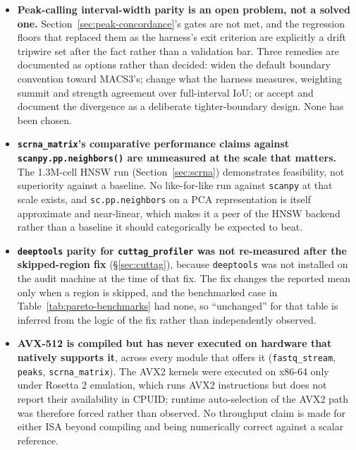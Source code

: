 \documentclass[10pt,twocolumn]{article}
\begin{document}
\begin{itemize}\itemsep3pt

\item \textbf{Peak-calling interval-width parity is an open problem, not a
  solved one.} Section~\ref{sec:peak-concordance}'s \ParityGate{} gates are
  not met, and the regression floors that replaced them as the harness's exit
  criterion are explicitly a drift tripwire set after the fact rather than a
  validation bar. Three remedies are documented as options rather than
  decided: widen the default boundary convention toward MACS3's; change what
  the harness measures, weighting summit and strength agreement over
  full-interval IoU; or accept and document the divergence as a deliberate
  tighter-boundary design. None has been chosen.

\item \textbf{\texttt{scrna\_matrix}'s comparative performance claims against
  \texttt{scanpy.pp.neighbors()} are unmeasured at the scale that matters.}
  The 1.3M-cell HNSW run (Section~\ref{sec:scrna}) demonstrates feasibility,
  not superiority against a baseline. No like-for-like run against
  \texttt{scanpy} at that scale exists, and \texttt{sc.pp.neighbors} on a PCA
  representation is itself approximate and near-linear, which makes it a peer
  of the HNSW backend rather than a baseline it should categorically be
  expected to beat.

\item \textbf{\texttt{deeptools} parity for \texttt{cuttag\_profiler} was not
  re-measured after the skipped-region fix} (\S\ref{sec:cuttag}), because
  \texttt{deeptools} was not installed on the audit machine at the time of
  that fix. The fix changes the reported mean only when a region is skipped,
  and the benchmarked case in Table~\ref{tab:pareto-benchmarks} had none, so
  ``unchanged'' for that table is inferred from the logic of the fix rather
  than independently observed.

\item \textbf{AVX-512 is compiled but has never executed on hardware that
  natively supports it}, across every module that offers it
  (\texttt{fastq\_stream}, \texttt{peaks}, \texttt{scrna\_matrix}). The AVX2
  kernels were executed on x86-64 only under Rosetta 2 emulation, which runs
  AVX2 instructions but does not report their availability in CPUID; runtime
  auto-selection of the AVX2 path was therefore forced rather than observed.
  No throughput claim is made for either ISA beyond compiling and being
  numerically correct against a scalar reference.


\end{itemize}
\end{document}
